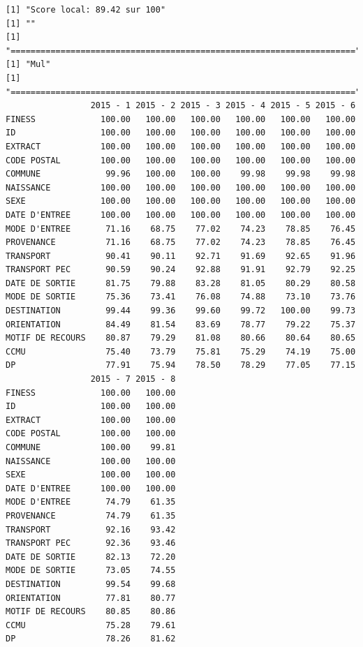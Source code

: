 \documentclass[]{article}
\begin{document}
\begin{verbatim}
[1] "Score local: 89.42 sur 100"
[1] ""
[1] "====================================================================="
[1] "Mul"
[1] "====================================================================="
                 2015 - 1 2015 - 2 2015 - 3 2015 - 4 2015 - 5 2015 - 6
FINESS             100.00   100.00   100.00   100.00   100.00   100.00
ID                 100.00   100.00   100.00   100.00   100.00   100.00
EXTRACT            100.00   100.00   100.00   100.00   100.00   100.00
CODE POSTAL        100.00   100.00   100.00   100.00   100.00   100.00
COMMUNE             99.96   100.00   100.00    99.98    99.98    99.98
NAISSANCE          100.00   100.00   100.00   100.00   100.00   100.00
SEXE               100.00   100.00   100.00   100.00   100.00   100.00
DATE D'ENTREE      100.00   100.00   100.00   100.00   100.00   100.00
MODE D'ENTREE       71.16    68.75    77.02    74.23    78.85    76.45
PROVENANCE          71.16    68.75    77.02    74.23    78.85    76.45
TRANSPORT           90.41    90.11    92.71    91.69    92.65    91.96
TRANSPORT PEC       90.59    90.24    92.88    91.91    92.79    92.25
DATE DE SORTIE      81.75    79.88    83.28    81.05    80.29    80.58
MODE DE SORTIE      75.36    73.41    76.08    74.88    73.10    73.76
DESTINATION         99.44    99.36    99.60    99.72   100.00    99.73
ORIENTATION         84.49    81.54    83.69    78.77    79.22    75.37
MOTIF DE RECOURS    80.87    79.29    81.08    80.66    80.64    80.65
CCMU                75.40    73.79    75.81    75.29    74.19    75.00
DP                  77.91    75.94    78.50    78.29    77.05    77.15
                 2015 - 7 2015 - 8
FINESS             100.00   100.00
ID                 100.00   100.00
EXTRACT            100.00   100.00
CODE POSTAL        100.00   100.00
COMMUNE            100.00    99.81
NAISSANCE          100.00   100.00
SEXE               100.00   100.00
DATE D'ENTREE      100.00   100.00
MODE D'ENTREE       74.79    61.35
PROVENANCE          74.79    61.35
TRANSPORT           92.16    93.42
TRANSPORT PEC       92.36    93.46
DATE DE SORTIE      82.13    72.20
MODE DE SORTIE      73.05    74.55
DESTINATION         99.54    99.68
ORIENTATION         77.81    80.77
MOTIF DE RECOURS    80.85    80.86
CCMU                75.28    79.61
DP                  78.26    81.62
\end{verbatim}
\end{document}

